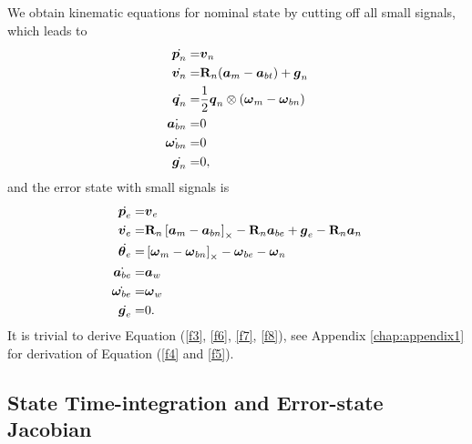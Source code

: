 We obtain kinematic equations for nominal state by cutting off all small signals, which leads to
\begin{align}
	\label{f12}
	\dot{\boldsymbol{p}_n} =& \boldsymbol{v}_n \\
	\label{f11}
	\dot{\boldsymbol{v}_n} =& \mathbf{R}_n(\boldsymbol{a}_m - \boldsymbol{a}_{bt}) + \boldsymbol{g}_n\\
	\dot{\boldsymbol{q}_n} =& \frac{1}{2}\boldsymbol{q}_n \otimes (\boldsymbol{\omega}_m - \boldsymbol{\omega}_{bn})\\
	\dot{\boldsymbol{a}_{bn}} =& 0 \\
	\dot{\boldsymbol{\omega}_{bn}} =& 0 \\ 
	\label{f13}
	\dot{\boldsymbol{g}_n} =& 0,
\end{align}
and the error state with small signals is
\begin{align}
	\label{f3}
	\dot{\boldsymbol{p}_e} =& \boldsymbol{v}_e \\
	\label{f4}
	\dot{\boldsymbol{v}_e} =& \mathbf{R}_n \left[ \boldsymbol{a}_m - \boldsymbol{a}_{bn} \right]_{\times} -  \mathbf{R}_n\boldsymbol{a}_{be} + \boldsymbol{g}_e - \mathbf{R}_n\boldsymbol{a}_n\\
	\label{f5}
	\dot{\boldsymbol{\theta}_e} =& \left[ \boldsymbol{\omega}_m - \boldsymbol{\omega}_{bn} \right]_{\times} - \boldsymbol{\omega}_{be} - \boldsymbol{\omega}_{n}\\
	\label{f6}
	\dot{\boldsymbol{a}_{be}} =& \boldsymbol{a}_w \\
	\label{f7}
	\dot{\boldsymbol{\omega}_{be}} =& \boldsymbol{\omega}_{w} \\ 
	\label{f8}
	\dot{\boldsymbol{g}_e} =& 0. 
\end{align}
It is trivial to derive Equation (\ref{f3}, \ref{f6}, \ref{f7}, \ref{f8}), see Appendix \ref{chap:appendix1} for derivation of Equation (\ref{f4} and \ref{f5}).

\subsection{State Time-integration and Error-state Jacobian}
\label{subsec:ESKF_IMU_sub3}

